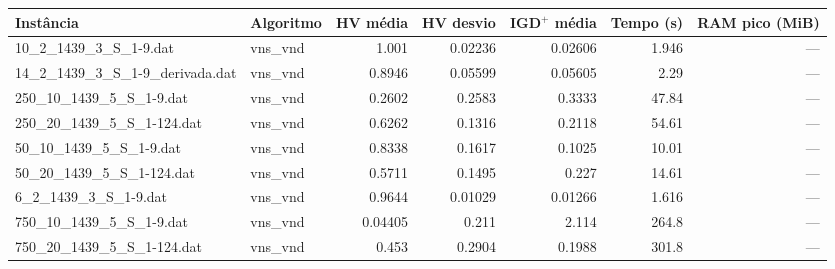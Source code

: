 \begin{tabular}{llrrrrr}
\hline
Instância & Algoritmo & HV média & HV desvio & IGD$^+$ média & Tempo (s) & RAM pico (MiB) \\
\hline
10\_2\_1439\_3\_S\_1-9.dat & vns\_vnd & 1.001 & 0.02236 & 0.02606 & 1.946 & — \\
14\_2\_1439\_3\_S\_1-9\_derivada.dat & vns\_vnd & 0.8946 & 0.05599 & 0.05605 & 2.29 & — \\
250\_10\_1439\_5\_S\_1-9.dat & vns\_vnd & 0.2602 & 0.2583 & 0.3333 & 47.84 & — \\
250\_20\_1439\_5\_S\_1-124.dat & vns\_vnd & 0.6262 & 0.1316 & 0.2118 & 54.61 & — \\
50\_10\_1439\_5\_S\_1-9.dat & vns\_vnd & 0.8338 & 0.1617 & 0.1025 & 10.01 & — \\
50\_20\_1439\_5\_S\_1-124.dat & vns\_vnd & 0.5711 & 0.1495 & 0.227 & 14.61 & — \\
6\_2\_1439\_3\_S\_1-9.dat & vns\_vnd & 0.9644 & 0.01029 & 0.01266 & 1.616 & — \\
750\_10\_1439\_5\_S\_1-9.dat & vns\_vnd & 0.04405 & 0.211 & 2.114 & 264.8 & — \\
750\_20\_1439\_5\_S\_1-124.dat & vns\_vnd & 0.453 & 0.2904 & 0.1988 & 301.8 & — \\
\hline
\end{tabular}
